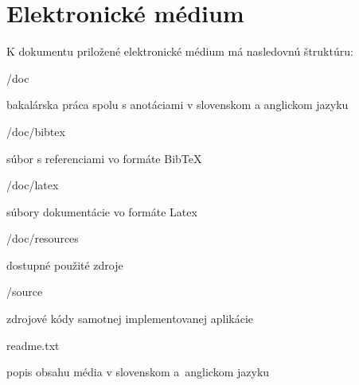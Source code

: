 \newpage
\section{Elektronické médium}

K dokumentu priložené elektronické médium má nasledovnú štruktúru:
\begin{my_itemize}

\emptyitem /doc
    \begin{my_itemize}
    \myitem bakalárska práca spolu s anotáciami v slovenskom a anglickom jazyku
    \end{my_itemize}

\emptyitem /doc/bibtex
    \begin{my_itemize}
    \myitem súbor s referenciami vo formáte BibTeX
    \end{my_itemize}

\emptyitem /doc/latex
    \begin{my_itemize}
    \myitem súbory dokumentácie vo formáte Latex
    \end{my_itemize}

\emptyitem /doc/resources
    \begin{my_itemize}
    \myitem dostupné použité zdroje
    \end{my_itemize}

\emptyitem /source
    \begin{my_itemize}
    \myitem zdrojové kódy samotnej implementovanej aplikácie
    \end{my_itemize}

\emptyitem readme.txt
    \begin{my_itemize}
    \myitem popis obsahu média v slovenskom a~anglickom jazyku
    \end{my_itemize}
\end{my_itemize}
